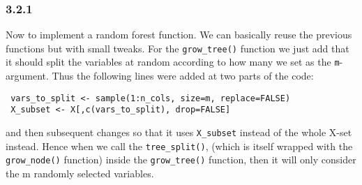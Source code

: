 \documentclass[10pt, a4paper, english]{article}\usepackage[]{graphicx}\usepackage[dvipsnames]{xcolor}
\begin{document}
\subsubsection{3.2.1}
Now to implement a random forest function. We can basically reuse the previous functions but with small tweaks. For the \texttt{grow\_tree()} function we just add that it should split the variables at random according to how many we set as the \texttt{m}-argument. Thus the following lines were added at two parts of the code: \begin{verbatim}
 vars_to_split <- sample(1:n_cols, size=m, replace=FALSE)
 X_subset <- X[,c(vars_to_split), drop=FALSE]
 \end{verbatim}
 and then subsequent changes so that it uses \texttt{X\_subset} instead of the whole X-set instead. 
 Hence when we call the \texttt{tree\_split()}, (which is itself wrapped with the \texttt{grow\_node()} function) inside the \texttt{grow\_tree()} function, then it will only consider the m randomly selected variables.
\end{document}
